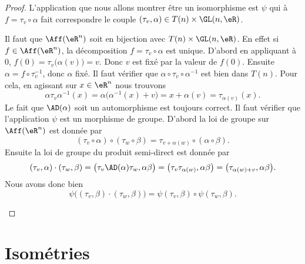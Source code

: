 \begin{proof}
	L'application que nous allons montrer être un isomorphisme est \( \psi\) qui à \( f=\tau_v\circ\alpha\) fait correspondre le couple \( (\tau_v,\alpha)\in T(n)\times \GL(n,\eR)\).
	\begin{subproof}
		Il faut que \( \Aff(\eR^n)\) soit en bijection avec \( T(n)\times \GL(n,\eR)\). En effet si \( f\in \Aff(\eR^n)\), la décomposition \(f=\tau_v\circ\alpha \) est unique. D'abord en appliquant à \( 0\), \( f(0)=\tau_v\big( \alpha(v) \big)=v\). Donc \( v\) est fixé par la valeur de \( f(0)\). Ensuite \( \alpha=f\circ\tau_v^{-1}\), donc \( \alpha \) fixé.
		Il faut vérifier que \( \alpha\circ\tau_v\circ\alpha^{-1}\) est bien dans \( T(n)\). Pour cela, en agissant sur \( x\in \eR^n\) nous trouvons
		\begin{equation}
			\alpha\tau_v\alpha^{-1}(x)=\alpha\big( \alpha^{-1}(x)+v \big)=x+\alpha(v)=\tau_{\alpha(v)}(x).
		\end{equation}
		Le fait que \( \AD(\alpha)\) soit un automorphisme est toujours correct.
		\spitem[Morphisme]
		Il faut vérifier que l'application \( \psi\) est un morphisme de groupe. D'abord la loi de groupe sur \( \Aff(\eR^n)\) est donnée par
		\begin{equation}
			(\tau_v\circ \alpha)\circ(\tau_w\circ\beta)=\tau_{v+\alpha(w)}\circ(\alpha\circ\beta).
		\end{equation}
		Ensuite la loi de groupe du produit semi-direct est donnée par
		\begin{equation}
			(\tau_v,\alpha)\cdot(\tau_w,\beta)=\big( \tau_v\AD(\alpha)\tau_w,\alpha\beta \big)=\big( \tau_v\tau_{\alpha(w)},\alpha\beta \big)=\big( \tau_{\alpha(w)+v},\alpha\beta \big).
		\end{equation}
		Nous avons donc bien
		\begin{equation}
			\psi\big( (\tau_v,\beta)\cdot(\tau_w,\beta) \big)=\psi(\tau_v,\beta)\circ\psi(\tau_w,\beta).
		\end{equation}
	\end{subproof}
\end{proof}

\section{Isométries}

